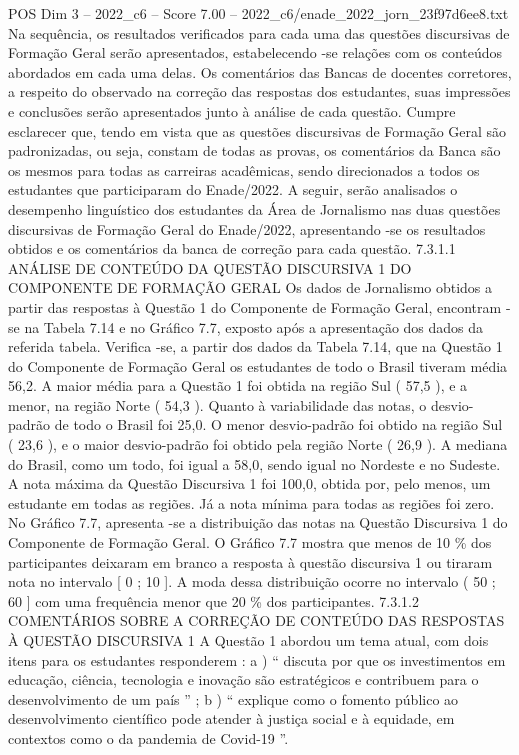 \begin{textsample}{POS Dim 3 – 2022\_c6 – Score 7.00 – 2022\_c6/enade\_2022\_jorn\_23f97d6ee8.txt}
Na sequência, os resultados verificados para cada uma das questões discursivas de Formação Geral serão apresentados, estabelecendo -se relações com os conteúdos abordados em cada uma delas.
Os comentários das Bancas de docentes corretores, a respeito do observado na correção das respostas dos estudantes, suas impressões e conclusões serão apresentados junto à análise de cada questão.
Cumpre esclarecer que, tendo em vista que as questões discursivas de Formação Geral são padronizadas, ou seja, constam de todas as provas, os comentários da Banca são os mesmos para todas as carreiras acadêmicas, sendo direcionados a todos os estudantes que participaram do Enade/2022.
A seguir, serão analisados o desempenho linguístico dos estudantes da Área de Jornalismo nas duas questões discursivas de Formação Geral do Enade/2022, apresentando -se os resultados obtidos e os comentários da banca de correção para cada questão. 7.3.1.1 ANÁLISE DE CONTEÚDO DA QUESTÃO DISCURSIVA 1 DO COMPONENTE DE FORMAÇÃO GERAL Os dados de Jornalismo obtidos a partir das respostas à Questão 1 do Componente de Formação Geral, encontram -se na Tabela 7.14 e no Gráfico 7.7, exposto após a apresentação dos dados da referida tabela.
Verifica -se, a partir dos dados da Tabela 7.14, que na Questão 1 do Componente de Formação Geral os estudantes de todo o Brasil tiveram média 56,2.
A maior média para a Questão 1 foi obtida na região Sul ( 57,5 ), e a menor, na região Norte ( 54,3 ).
Quanto à variabilidade das notas, o desvio-padrão de todo o Brasil foi 25,0.
O menor desvio-padrão foi obtido na região Sul ( 23,6 ), e o maior desvio-padrão foi obtido pela região Norte ( 26,9 ).
A mediana do Brasil, como um todo, foi igual a 58,0, sendo igual no Nordeste e no Sudeste.
A nota máxima da Questão Discursiva 1 foi 100,0, obtida por, pelo menos, um estudante em todas as regiões.
Já a nota mínima para todas as regiões foi zero.
No Gráfico 7.7, apresenta -se a distribuição das notas na Questão Discursiva 1 do Componente de Formação Geral.
O Gráfico 7.7 mostra que menos de 10 \% dos participantes deixaram em branco a resposta à questão discursiva 1 ou tiraram nota no intervalo [ 0 ; 10 ].
A moda dessa distribuição ocorre no intervalo ( 50 ; 60 ] com uma frequência menor que 20 \% dos participantes. 7.3.1.2 COMENTÁRIOS SOBRE A CORREÇÃO DE CONTEÚDO DAS RESPOSTAS À QUESTÃO DISCURSIVA 1 A Questão 1 abordou um tema atual, com dois itens para os estudantes responderem : a ) “ discuta por que os investimentos em educação, ciência, tecnologia e inovação são estratégicos e contribuem para o desenvolvimento de um país ” ; b ) “ explique como o fomento público ao desenvolvimento científico pode atender à justiça social e à equidade, em contextos como o da pandemia de Covid-19 ”.

\end{textsample}
